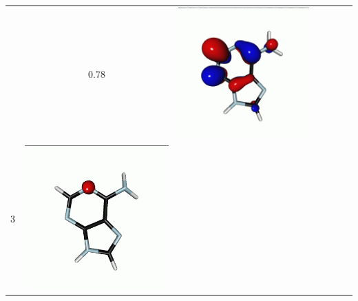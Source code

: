 \documentclass[journal=jctcce,manuscript=article]{achemso}
\begin{document}
\begin{table}[H]
\begin{tabular}{ l | c c c | c c c }
\begin{minipage}{0.2\textwidth}
    \end{minipage}
    & 0.78 & 
    \begin{minipage}{0.2\textwidth}
        \centering
        \includegraphics[scale=0.10]{NTO/Adenine_N/2p_Cs.png}
    \end{minipage}
    \\
            3 &  
    \begin{minipage}{0.2\textwidth}
        \centering
        \includegraphics[scale=0.10]{NTO/Adenine_N/3h_C1.png}

\end{minipage}
\end{tabular}
\end{table}
\end{document}

